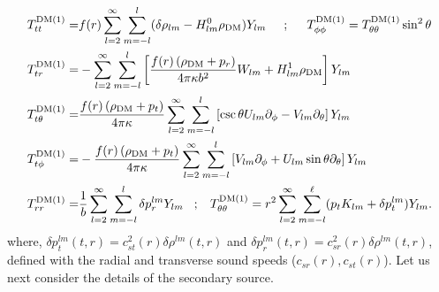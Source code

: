 \documentclass[11pt]{article}
\begin{document}
\begin{align}\label{fluid_pert_em_tensor}
T_{tt}^{\textrm{DM}(1)} =& f(r)\sum_{l=2}^\infty\sum_{m=-l}^{l}(\delta\rho_{l m}-H^0_{l m}\rho_{\textrm{DM}})Y_{l m} \hspace{5mm} ; \hspace{5mm} T_{\phi\phi}^{\textrm{DM}(1)} =  T_{\theta\theta}^{\textrm{DM}(1)}\sin^2\theta  \nonumber\\
T_{tr}^{\textrm{DM}(1)} =& -\sum_{l=2}^\infty\sum_{m=-l}^{l}\left[\frac{f(r)\left(\rho_{\textrm{DM}} + p_r\right)}{4\pi\kappa  b^2}W_{l m}+H^{1}_{l m} \rho_{\textrm{DM}}\right] Y_{l m} \nonumber\\
T_{t\theta}^{\textrm{DM}(1)} =&
\frac{f(r)\left(\rho_{\textrm{DM}} + p_t\right)}{4\pi\kappa}\sum_{l=2}^\infty\sum_{m=-l}^{l}\left[\csc\theta  U_{l m} \partial_{\phi}-V_{l m}\partial_{\theta}\right]Y_{l m} \nonumber\\
T_{t\phi}^{\textrm{DM}(1)} =&
-\frac{f(r)\left(\rho_{\textrm{DM}} + p_t\right)}{4\pi \kappa}\sum_{l=2}^\infty\sum_{m=-l}^{l}\left[V_{l m} \partial_{\phi}+U_{l m}\sin\theta\partial_{\theta}\right]Y_{l m} \nonumber\\
T_{rr}^{\textrm{DM}(1)} =& \frac{1}{b}\sum_{l=2}^\infty\sum_{m=-l}^{l}  \delta p_{r}^{l m} Y_{l m} \hspace{3mm} ; \hspace{3mm}
T_{\theta\theta}^{\textrm{DM}(1)} = r^2 \sum_{l=2}^\infty\sum_{m=-l}^\ell(p_t K_{l m}+
\delta p_{t}^{l m})Y_{l m} .
\end{align}
where, $\delta p^{lm}_{t} (t, r) = c^{2}_{st}(r) \delta\rho^{lm}(t, r)$ and $\delta p^{lm}_{r} (t, r) = c^{2}_{sr}(r) \delta\rho^{lm}(t, r)$, defined with the radial and transverse sound speeds ($c_{sr}(r), c_{st}(r)$). %
%
Let us next consider the details of the secondary source.
\end{document}

